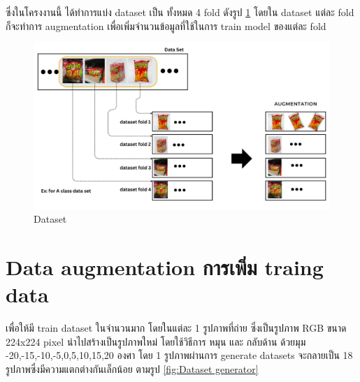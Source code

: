 ซึ่งในโครงงานนี้ ได้ทำการแบ่ง dataset เป็น ทั้งหมด 4 fold ดังรูป \ref{fig:Dataset}
โดยใน dataset แต่ละ fold ก็จะทำการ augmentation เพื่อเพิ่มจำนวนข้อมูลที่ใช้ในการ train model ของแต่ละ fold
\begin{figure}[h]
  \begin{center}

    \includegraphics[scale=0.3]{pic/model/fold_aug.png}
  \end{center}

  \caption[Dataset]{Dataset}
  \label{fig:Dataset}
\end{figure}

\newpage



\section{Data augmentation การเพิ่ม traing data}
เพื่อให้มี train dataset ในจำนวนมาก
โดยในแต่ละ 1 รูปภาพที่ถ่าย ซึ่งเป็นรูปภาพ RGB ขนาด 224x224 pixel
นำไปสร้างเป็นรูปภาพใหม่ โดยใช้วิธีการ หมุน และ กลับด้าน ด้วยมุม -20,-15,-10,-5,0,5,10,15,20 องศา
โดย 1 รูปภาพผ่านการ generate datasets จะกลายเป็น 18 รูปภาพซึ่งมีความแตกต่างกันเล็กน้อย ตามรูป \ref{fig:Dataset generator}

